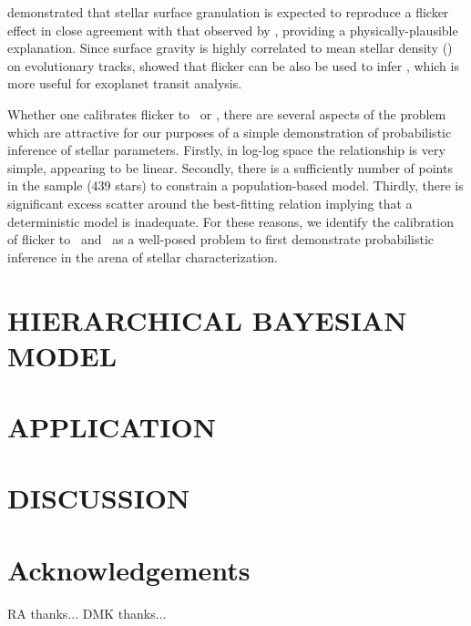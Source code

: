 \documentclass[apjl]{emulateapj}
\begin{document}
\citet{cranmer:2014} demonstrated that stellar surface granulation is expected
to reproduce a flicker effect in close agreement with that observed by 
\citet{bastien:2013}, providing a physically-plausible explanation. Since
surface gravity is highly correlated to mean stellar density (\rhostar) on 
evolutionary tracks, \citet{kipping:2014} showed that flicker can be also 
be used to infer \rhostar, which is more useful for exoplanet transit 
analysis.

Whether one calibrates flicker to \logg\ or \rhostar, there are several aspects
of the problem which are attractive for our purposes of a simple demonstration
of probabilistic inference of stellar parameters. Firstly, in log-log space the
relationship is very simple, appearing to be linear. Secondly, there is a
sufficiently number of points in the sample (439 stars) to constrain a 
population-based model. Thirdly, there is significant excess scatter around the
best-fitting relation implying that a deterministic model is inadequate. For
these reasons, we identify the calibration of flicker to \logg\ and \rhostar\
as a well-posed problem to first demonstrate probabilistic inference in the 
arena of stellar characterization.

\section{HIERARCHICAL BAYESIAN MODEL}
\label{sec:HBM}



\section{APPLICATION}
\label{sec:appication}



\section{DISCUSSION}
\label{sec:discussion}



\acknowledgements
\section*{Acknowledgements}

RA thanks...
DMK thanks...
\end{document}
